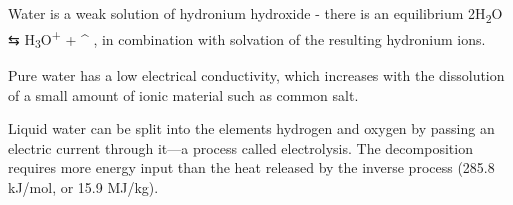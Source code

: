 Water is a weak solution of hydronium hydroxide - there is an equilibrium 2H\textsubscript{2}O ⇆
H\textsubscript{3}O\textsuperscript{+} + \^{} , in combination with solvation of the resulting hydronium ions.

Pure water has a low electrical conductivity, which increases with the dissolution of a small amount of ionic material such as common salt.

Liquid water can be split into the elements hydrogen and oxygen by passing an electric current through it---a process called electrolysis. The decomposition requires more energy input than the heat released by the inverse process (285.8 kJ/mol, or 15.9 MJ/kg).


